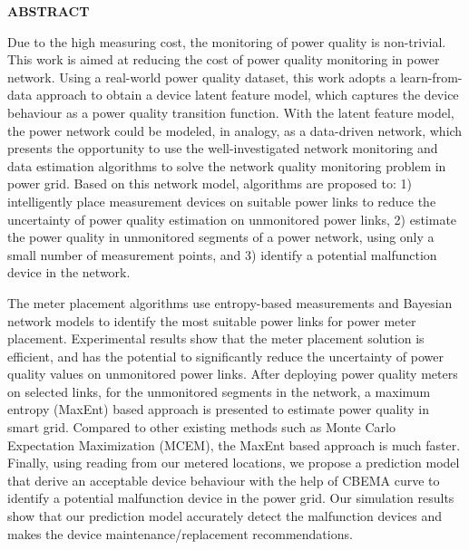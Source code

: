 \newpage
{}


\begin{center}
\textbf{ABSTRACT}
\end{center}

Due to the high measuring cost, the monitoring of power quality is non-trivial. This work is aimed at reducing the cost of power quality monitoring in power network. Using a real-world power quality dataset, this work adopts a learn-from-data approach to obtain a device latent feature model, which captures the device behaviour as a power quality transition function. With the latent feature model, the power network could be modeled, in analogy, as a data-driven network, which presents the opportunity to use the well-investigated network monitoring and data estimation algorithms to solve the network quality monitoring problem in power grid. Based on this network model, algorithms are proposed to: 1) intelligently place measurement devices on suitable power links to reduce the uncertainty of power quality estimation on unmonitored power links, 2) estimate the power quality in unmonitored segments of a power network, using only a small number of measurement points, and 3) identify a potential malfunction device in the network.

The meter placement algorithms use entropy-based measurements and Bayesian network models to identify the most suitable power links for power meter placement. Experimental results show that the meter placement solution is efficient, and has the potential to significantly reduce the uncertainty of power quality values on unmonitored power links. After deploying power quality meters on selected links, for the unmonitored segments in the network, a maximum entropy (MaxEnt) based approach is presented to estimate power quality in smart grid. Compared to other existing methods such as Monte Carlo Expectation Maximization (MCEM), the MaxEnt based approach is much faster. Finally, using reading from our metered locations, we propose a prediction model that derive an acceptable device behaviour with the help of CBEMA curve to identify a potential malfunction device in the power grid. Our simulation results show that our prediction model accurately detect the malfunction devices and makes the device maintenance/replacement recommendations.